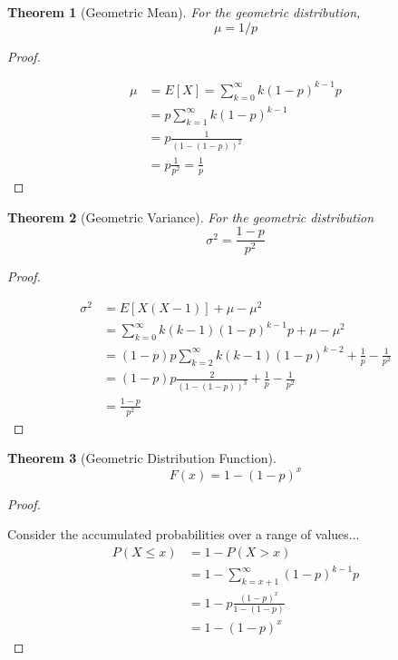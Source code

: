 \documentclass[10pt,]{book}
\theoremstyle{plain}
\newtheorem{theorem}{Theorem}[section]
\theoremstyle{definition}
\theoremstyle{definition}
\theoremstyle{definition}
\numberwithin{equation}{section}
\newcommand{\gt}{ > }
\begin{document}
\begin{theorem}[{Geometric Mean}]\label{theorem-37}
For the geometric distribution, 
			\begin{equation*}\mu = 1/p\end{equation*}\end{theorem}
\begin{proof}\hypertarget{proof-38}{}
 
			\begin{align*}
\mu & = E[X] = \sum_{k=0}^{\infty} {k(1-p)^{k-1}p}\\
 & = p \sum_{k=1}^{\infty} {k(1-p)^{k-1}}\\
 & = p \frac{1}{(1-(1-p))^2}\\
 & = p \frac{1}{p^2} = \frac{1}{p}
\end{align*}
\end{proof}
\begin{theorem}[{Geometric Variance}]\label{theorem-38}
For the geometric distribution 
				\begin{equation*}\sigma^2  = \frac{1-p}{p^2}\end{equation*}\end{theorem}
\begin{proof}\hypertarget{proof-39}{}
 
			\begin{align*}
\sigma^2 & = E[X(X-1)] + \mu - \mu^2 \\
 & = \sum_{k=0}^{\infty} {k(k-1)(1-p)^{k-1}p} + \mu - \mu^2 \\
 & = (1-p)p \sum_{k=2}^{\infty} {k(k-1)(1-p)^{k-2}} + \frac{1}{p} - \frac{1}{p^2}\\
 & = (1-p)p \frac{2}{(1-(1-p))^3} + \frac{1}{p} - \frac{1}{p^2}\\
 & = \frac{1-p}{p^2}
\end{align*}
\end{proof}
\begin{theorem}[{Geometric Distribution Function}]\label{theorem-39}
\begin{equation*}F(x) =  1- (1-p)^{x}\end{equation*}\end{theorem}
\begin{proof}\hypertarget{proof-40}{}
 Consider the accumulated probabilities over a range of values...
		\begin{align*}
 P(X \le x) & = 1 - P(X \gt x)\\
 & = 1- \sum_{k={x+1}}^{\infty} {(1-p)^{k-1}p}\\
 & = 1- p \frac{(1-p)^{x}}{1-(1-p)}\\
 & = 1- (1-p)^{x}
\end{align*}
\end{proof}
\end{document}
